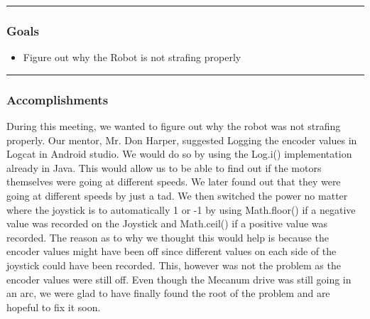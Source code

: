 \noindent\hfil\rule{\textwidth}{.4pt}\hfil
\subsubsection*{Goals}
\begin{itemize}
    \item Figure out why the Robot is not strafing properly

\end{itemize} 

\noindent\hfil\rule{\textwidth}{.4pt}\hfil

\subsubsection*{Accomplishments}
During this meeting, we wanted to figure out why the robot was not strafing properly. Our mentor, Mr. Don Harper, suggested Logging the encoder values in Logcat in Android studio. We would do so by using the Log.i() implementation already in Java. This would allow us to be able to find out if the motors themselves were going at different speeds. We later found out that they were going at different speeds by just a tad. We then switched the power no matter where the joystick is to automatically 1 or -1 by using Math.floor() if a negative value was recorded on the Joystick and Math.ceil() if a positive value was recorded. The reason as to why we thought this would help is because the encoder values might have been off since different values on each side of the joystick could have been recorded. This, however was not the problem as the encoder values were still off. Even though the Mecanum drive was still going in an arc, we were glad to have finally found the root of the problem and are hopeful to fix it soon.





